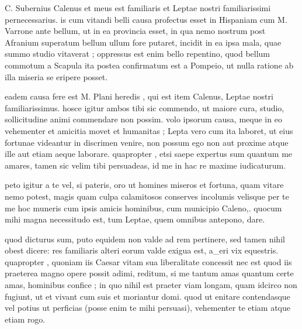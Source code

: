 


 C. Subernius Calenus et meus est familiaris et Leptae nostri familiarissimi pernecessarius. is cum vitandi belli causa profectus esset in Hispaniam cum M. Varrone ante bellum, ut in ea provincia esset, in qua nemo nostrum post Afranium superatum bellum ullum fore putaret, incidit in ea ipsa mala, quae summo studio vitaverat ; oppressus est enim bello repentino, quod bellum commotum a Scapula ita postea confirmatum est a Pompeio, ut nulla ratione ab illa miseria se eripere posset.

 eadem causa fere est M. Plani heredis , qui est item Calenus, Leptae nostri familiarissimus. hosce igitur ambos tibi sic commendo, ut maiore cura, studio, sollicitudine animi commendare non possim. volo ipsorum causa, meque in eo vehementer et amicitia movet et humanitas ; Lepta vero cum ita laboret, ut eius fortunae videantur in discrimen venire, non possum ego non aut proxime atque ille aut etiam aeque laborare. quapropter , etsi saepe expertus sum quantum me amares, tamen sic velim tibi persuadeas, id me in hac re maxime iudicaturum.

 peto igitur a te vel, si pateris, oro ut homines miseros et fortuna, quam vitare nemo potest, magis quam culpa calamitosos conserves incolumis velisque per te me hoc muneris cum ipsis amicis hominibus, cum municipio Caleno,. quocum mihi magna necessitudo est, tum Leptae, quem omnibus antepono, dare.

 quod dicturus sum, puto equidem non valde ad rem pertinere, sed tamen nihil obest dicere: res familiaris alteri eorum valde exigua est, a_eri vix equestris. quapropter , quoniam iis Caesar vitam sua liberalitate concessit nec est quod iis praeterea magno opere possit adimi, reditum, si me tantum amas quantum certe amas, hominibus confice ; in quo nihil est praeter viam longam, quam idcirco non fugiunt, ut et vivant cum suis et moriantur domi. quod ut enitare contendasque vel potius ut perficias (posse enim te mihi persuasi), vehementer te etiam atque etiam rogo.

